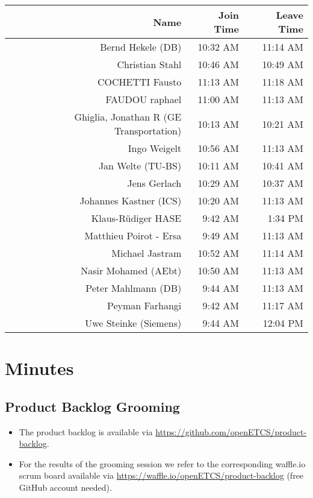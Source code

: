 \documentclass[a4paper, 11pt]{article}
\begin{document}
\begin{table}[htbp]
    \begin{tabular}{rrr}
    \toprule
    \textbf{Name} & \textbf{Join Time} & \textbf{Leave Time} \\
    \midrule
    Bernd Hekele (DB) & 10:32 AM & 11:14 AM \\
    Christian Stahl & 10:46 AM & 10:49 AM \\
    COCHETTI Fausto & 11:13 AM & 11:18 AM \\
    FAUDOU raphael & 11:00 AM & 11:13 AM \\
    Ghiglia, Jonathan R (GE Transportation) & 10:13 AM & 10:21 AM \\
    Ingo Weigelt & 10:56 AM & 11:13 AM \\
    Jan Welte (TU-BS) & 10:11 AM & 10:41 AM \\
    Jens Gerlach & 10:29 AM & 10:37 AM \\
    Johannes Kastner (ICS) & 10:20 AM & 11:13 AM \\
    Klaus-R\"udiger HASE & 9:42 AM & 1:34 PM \\
    Matthieu Poirot - Ersa & 9:49 AM & 11:13 AM \\
    Michael Jastram & 10:52 AM & 11:14 AM \\
    Nasir Mohamed (AEbt) & 10:50 AM & 11:13 AM \\
    Peter Mahlmann (DB) & 9:44 AM & 11:13 AM \\
    Peyman Farhangi & 9:42 AM & 11:17 AM \\
    Uwe Steinke (Siemens) & 9:44 AM & 12:04 PM \\


     \bottomrule
    \end{tabular}%
  \label{tab:addlabel}%
\end{table}%




\section{Minutes}

\subsection{Product Backlog Grooming}
\begin{itemize}
\item The product backlog is available via 
\url{https://github.com/openETCS/product-backlog}. 
\item For the results of the grooming session we refer to the corresponding waffle.io scrum board available via \url{https://waffle.io/openETCS/product-backlog} (free GitHub account needed).
\end{itemize}
\end{document}
